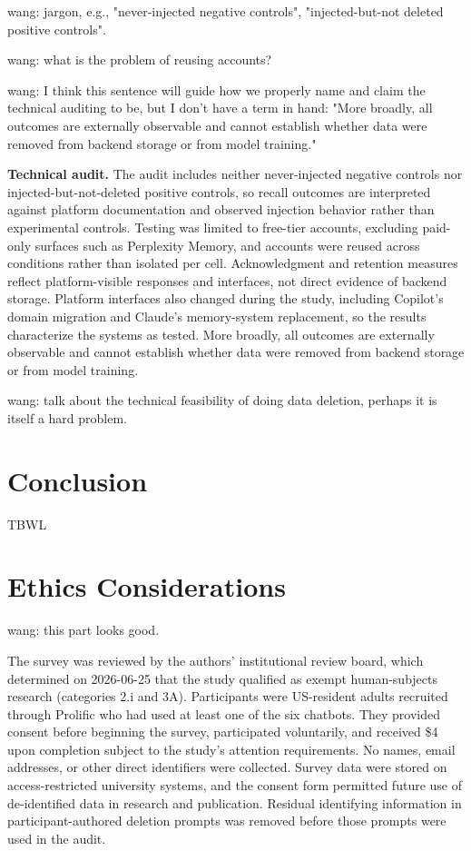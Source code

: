 \documentclass[conference,compsoc]{IEEEtran}
\newcommand{\xw}[1] {{\color{red}wang: #1}}
\begin{document}
\xw{jargon, e.g., "never-injected negative controls", "injected-but-not deleted positive controls".}

\xw{what is the problem of reusing accounts?}

\xw{I think this sentence will guide how we properly name and claim the technical auditing to be, but I don't have a term in hand: "More broadly, all outcomes are externally observable and cannot establish whether data were removed from backend storage or from model training."}

\textbf{Technical audit.} The audit includes neither never-injected negative controls nor injected-but-not-deleted positive controls, so recall outcomes are interpreted against platform documentation and observed injection behavior rather than experimental controls. Testing was limited to free-tier accounts, excluding paid-only surfaces such as Perplexity Memory, and accounts were reused across conditions rather than isolated per cell. Acknowledgment and retention measures reflect platform-visible responses and interfaces, not direct evidence of backend storage. Platform interfaces also changed during the study, including Copilot's domain migration and Claude's memory-system replacement, so the results characterize the systems as tested. More broadly, all outcomes are externally observable and cannot establish whether data were removed from backend storage or from model training.


\xw{talk about the technical feasibility of doing data deletion, perhaps it is itself a hard problem.}


\section{Conclusion}
TBWL

\section*{Ethics Considerations}

\xw{this part looks good.}

The survey was reviewed by the authors' institutional review board, which determined on 2026-06-25 that the study qualified as exempt human-subjects research (categories 2.i and 3A). Participants were US-resident adults recruited through Prolific who had used at least one of the six chatbots. They provided consent before beginning the survey, participated voluntarily, and received \$4 upon completion subject to the study's attention requirements. No names, email addresses, or other direct identifiers were collected. Survey data were stored on access-restricted university systems, and the consent form permitted future use of de-identified data in research and publication. Residual identifying information in participant-authored deletion prompts was removed before those prompts were used in the audit.
\end{document}
